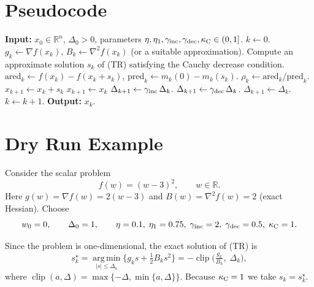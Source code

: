 \documentclass{article}
\newcommand{\R}{\mathbb{R}}
\begin{document}
\section*{Pseudocode}
\begin{algorithm}[H]
\caption{Trust Region Method}
\begin{algorithmic}[1]
\State \textbf{Input:} $x_{0}\in\R^{n}$, $\Delta_{0}>0$, parameters $\eta,\eta_{1},\gamma_{\rm inc},\gamma_{\rm dec},\kappa_{\rm C}\in(0,1]$.
\State $k\gets0$.
    \State $g_{k}\gets\nabla f(x_{k})$, $B_{k}\gets\nabla^{2}f(x_{k})$ (or a suitable approximation).
    \State Compute an approximate solution $s_{k}$ of (TR) satisfying the Cauchy decrease condition.
    \State $\text{ared}_{k}\gets f(x_{k})-f(x_{k}+s_{k})$,
          $\text{pred}_{k}\gets m_{k}(0)-m_{k}(s_{k})$.
    \State $\rho_{k}\gets \text{ared}_{k}/\text{pred}_{k}$.
        \State $x_{k+1}\gets x_{k}+s_{k}$ 
    \Else
        \State $x_{k+1}\gets x_{k}$ 
    \EndIf
        \State $\Delta_{k+1}\gets \gamma_{\rm inc}\,\Delta_{k}$.
        \State $\Delta_{k+1}\gets \gamma_{\rm dec}\,\Delta_{k}$.
    \Else
        \State $\Delta_{k+1}\gets \Delta_{k}$.
    \EndIf
    \State $k\gets k+1$.
\EndWhile
\State \textbf{Output:} $x_{k}$.
\end{algorithmic}
\end{algorithm}

\section*{Dry Run Example}
Consider the scalar problem
\[
f(w)=(w-3)^{2},\qquad w\in\R.
\]
Here $g(w)=\nabla f(w)=2(w-3)$ and $B(w)=\nabla^{2}f(w)=2$ (exact Hessian).  
Choose
\[
w_{0}=0,\qquad \Delta_{0}=1,\qquad
\eta=0.1,\;\eta_{1}=0.75,\;
\gamma_{\rm inc}=2,\;\gamma_{\rm dec}=0.5,\;
\kappa_{\rm C}=1.
\]

Since the problem is one‑dimensional, the exact solution of (TR) is
\[
s_{k}^{\star}= \operatorname*{arg\,min}_{|s|\le\Delta_{k}}
\bigl\{ g_{k}s+\tfrac12 B_{k}s^{2}\bigr\}
= -\operatorname{clip}\!\bigl(\tfrac{g_{k}}{B_{k}},\;\Delta_{k}\bigr),
\]
where $\operatorname{clip}(a,\Delta)=\max\{-\Delta,\min\{a,\Delta\}\}$.
Because $\kappa_{\rm C}=1$ we take $s_{k}=s_{k}^{\star}$.
\end{document}
